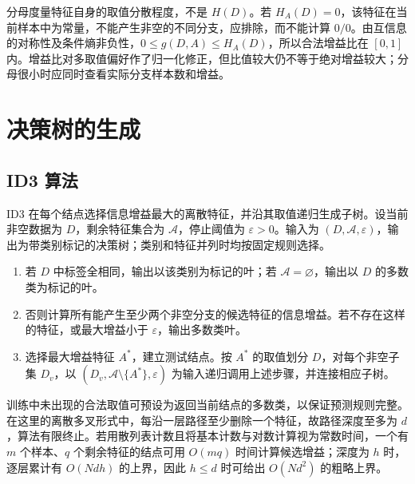 分母度量特征自身的取值分散程度，不是 $H(D)$。若 $H_A(D)=0$，该特征在当前样本中为常量，不能产生非空的不同分支，应排除，而不能计算 $0/0$。由互信息的对称性及条件熵非负性，$0\leq g(D,A)\leq H_A(D)$，所以合法增益比在 $[0,1]$ 内。增益比对多取值偏好作了归一化修正，但比值较大仍不等于绝对增益较大；分母很小时应同时查看实际分支样本数和增益。

\section{决策树的生成}
\label{sec:lihang-tree-generation}

\subsection{ID3 算法}

ID3 在每个结点选择信息增益最大的离散特征，并沿其取值递归生成子树。设当前非空数据为 $D$，剩余特征集合为 $\mathcal A$，停止阈值为 $\varepsilon>0$。输入为 $(D,\mathcal A,\varepsilon)$，输出为带类别标记的决策树；类别和特征并列时均按固定规则选择。
\begin{enumerate}
  \item 若 $D$ 中标签全相同，输出以该类别为标记的叶；若 $\mathcal A=\varnothing$，输出以 $D$ 的多数类为标记的叶。
  \item 否则计算所有能产生至少两个非空分支的候选特征的信息增益。若不存在这样的特征，或最大增益小于 $\varepsilon$，输出多数类叶。
  \item 选择最大增益特征 $A^*$，建立测试结点。按 $A^*$ 的取值划分 $D$，对每个非空子集 $D_v$，以 $(D_v,\mathcal A\setminus\{A^*\},\varepsilon)$ 为输入递归调用上述步骤，并连接相应子树。
\end{enumerate}
训练中未出现的合法取值可预设为返回当前结点的多数类，以保证预测规则完整。在这里的离散多叉形式中，每沿一层路径至少删除一个特征，故路径深度至多为 $d$，算法有限终止。若用散列表计数且将基本计数与对数计算视为常数时间，一个有 $m$ 个样本、$q$ 个剩余特征的结点可用 $O(mq)$ 时间计算候选增益；深度为 $h$ 时，逐层累计有 $O(Ndh)$ 的上界，因此 $h\leq d$ 时可给出 $O(Nd^2)$ 的粗略上界。

